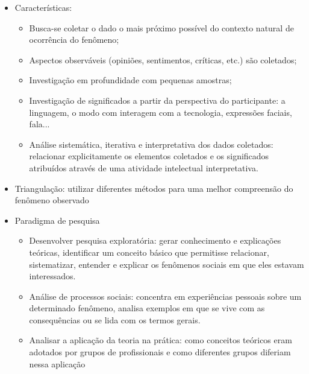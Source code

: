 \documentclass[11pt,a4paper]{book}
\begin{document}
\begin{itemize}
		\item Características:
			\begin{itemize}
				\item Busca-se coletar o dado o mais próximo possível do contexto natural de ocorrência do fenômeno;
				\item Aspectos observáveis (opiniões, sentimentos, críticas, etc.) são coletados;
				\item Investigação em profundidade com pequenas amostras;
				\item Investigação de significados a partir da perspectiva do participante: a linguagem, o modo com interagem com a tecnologia, expressões faciais, fala...
				\item Análise sistemática, iterativa e interpretativa dos dados coletados: relacionar explicitamente os elementos coletados e os significados atribuídos através de uma atividade intelectual interpretativa.
			\end{itemize}			 
		\item Triangulação: utilizar diferentes métodos para uma melhor compreensão do fenômeno observado
		
		\item Paradigma de pesquisa
		
			\begin{itemize}
				\item Desenvolver pesquisa exploratória: gerar conhecimento e explicações teóricas, identificar um conceito básico que permitisse relacionar, sistematizar, entender e explicar os fenômenos sociais em que eles estavam interessados.
				
				\item Análise de processos sociais: concentra em experiências pessoais sobre um determinado fenômeno, analisa exemplos em que se vive com as consequências ou se lida com os termos gerais.
				
				\item Analisar a aplicação da teoria na prática: como conceitos teóricos eram adotados por grupos de profissionais e como diferentes grupos diferiam nessa aplicação 
			\end{itemize}
	\end{itemize}
\end{document}
